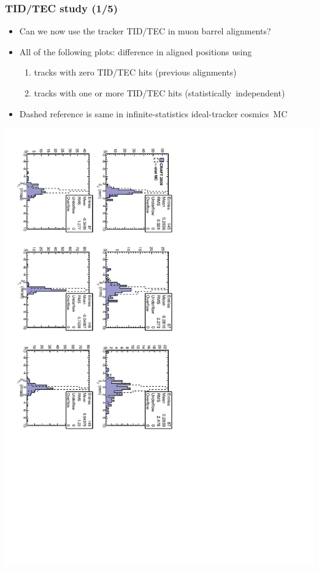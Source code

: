 \documentclass[compress]{beamer}
\begin{document}
\begin{frame}
\frametitle{TID/TEC study (1/5)}
\begin{itemize}
\item Can we now use the tracker TID/TEC in muon barrel alignments?
\item All of the following plots: difference in aligned positions using
\begin{enumerate}
\item tracks with zero TID/TEC hits (previous alignments)
\item tracks with one or more TID/TEC hits \mbox{(statistically independent)\hspace{-1 cm}}
\end{enumerate}
\item Dashed reference is same in infinite-statistics ideal-tracker \mbox{cosmics MC\hspace{-1 cm}}
\end{itemize}

\includegraphics[height=\linewidth, angle=90]{tecdiff.pdf}
\end{frame}
\end{document}
